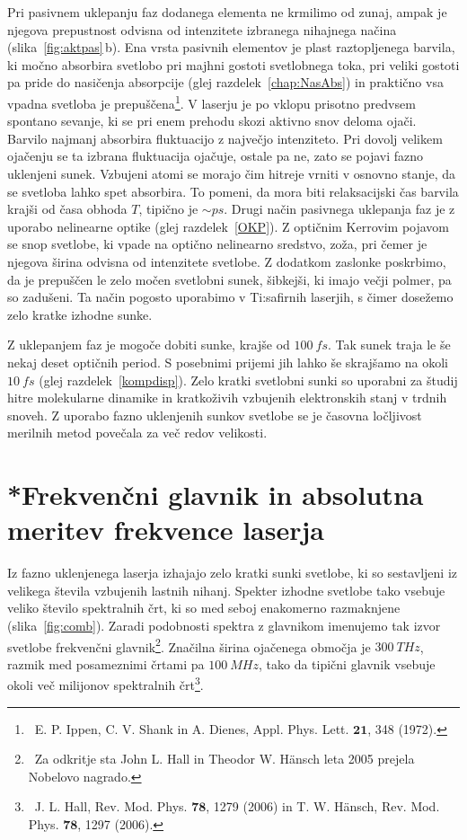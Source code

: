 Pri pasivnem uklepanju faz dodanega elementa ne krmilimo od zunaj, 
ampak je njegova prepustnost odvisna od intenzitete
izbranega nihajnega načina (slika~\ref{fig:aktpas}\,b). 
Ena vrsta pasivnih elementov je plast raztopljenega
barvila, ki močno absorbira svetlobo pri majhni gostoti svetlobnega toka, pri veliki 
gostoti pa pride do nasičenja absorpcije (glej
razdelek~\ref{chap:NasAbs}) in praktično vsa vpadna svetloba je 
prepuščena\footnote{~E. P. Ippen, C. V. Shank in A. Dienes, Appl. Phys. Lett. $\mathbf{21}$, 348 (1972).}. 
V laserju je po vklopu prisotno predvsem 
spontano sevanje, ki se pri enem prehodu skozi aktivno snov deloma ojači. 
Barvilo najmanj absorbira fluktuacijo z največjo intenziteto. Pri dovolj 
velikem ojačenju se ta izbrana fluktuacija ojačuje, ostale pa ne, zato
se pojavi fazno uklenjeni sunek. Vzbujeni atomi se morajo čim hitreje
vrniti v osnovno stanje, da se svetloba lahko spet absorbira. To pomeni, da
 mora biti relaksacijski čas barvila  krajši od časa
obhoda $T$, tipično je $\sim \si{ps}$. 
\newpage
Drugi način pasivnega uklepanja faz je z uporabo nelinearne optike 
(glej 
razdelek~\ref{OKP}). Z optičnim Kerrovim pojavom se snop svetlobe, ki vpade na 
optično nelinearno sredstvo, zoža, pri čemer je njegova širina odvisna od 
intenzitete svetlobe. Z dodatkom zaslonke poskrbimo, 
da je prepuščen le zelo močen svetlobni sunek, šibkejši, ki imajo večji polmer,
pa so zadušeni. Ta način pogosto
uporabimo v Ti:safirnih laserjih, s čimer dosežemo zelo
kratke izhodne sunke.

Z uklepanjem faz je mogoče dobiti sunke, krajše od $100~\si{fs}$. 
Tak sunek traja le še nekaj deset optičnih period. S posebnimi prijemi 
jih lahko še skrajšamo na okoli $10~\si{fs}$ (glej razdelek~\ref{kompdisp}). 
Zelo kratki svetlobni sunki so uporabni za študij hitre molekularne dinamike 
in kratkoživih vzbujenih elektronskih stanj v trdnih snoveh. Z uporabo fazno
uklenjenih sunkov svetlobe se je časovna ločljivost merilnih metod povečala za 
več redov velikosti.

\section{*Frekvenčni glavnik in absolutna meritev frekvence laserja}
Iz fazno uklenjenega laserja izhajajo zelo kratki sunki svetlobe, ki 
so sestavljeni iz velikega števila vzbujenih lastnih nihanj. Spekter 
izhodne svetlobe tako vsebuje veliko število spektralnih črt, ki
so med seboj enakomerno razmaknjene (slika~\ref{fig:comb}). Zaradi podobnosti spektra
z glavnikom imenujemo tak izvor svetlobe frekvenčni glavnik\footnote{~Za odkritje 
sta John L. Hall in Theodor W. H\"ansch leta 2005 prejela 
Nobelovo nagrado.}. Značilna širina ojačenega
območja je $300~\si{THz}$, razmik med posameznimi črtami pa $100~\si{MHz}$, tako 
da tipični glavnik vsebuje okoli več milijonov spektralnih črt\footnote{~J. 
L. Hall, Rev. Mod. Phys. $\mathbf{78}$, 1279 (2006) in 
T. W. H\"ansch, Rev. Mod. Phys. $\mathbf{78}$, 1297 (2006).}.

